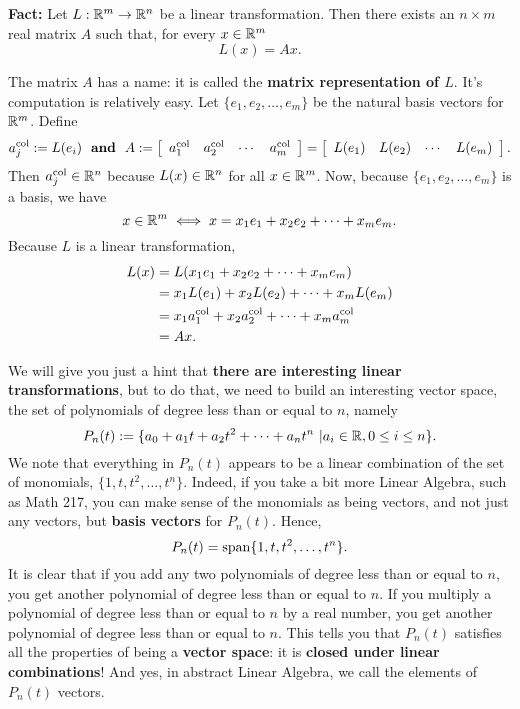 \begin{tcolorbox}[title=\textbf{Linear Transformations from $\real^m$ to $\real^n$ are Kind of Boring}]

\textbf{Fact:} Let $L:\mathbb R^m \to \mathbb R^n $ be a linear transformation. Then there exists an $n \times m$ real matrix $A$ such that, for every $x \in \mathbb R^m$
$$L(x)=Ax. $$

The matrix $A$ has a name: it is called the \textbf{matrix representation of $L$}. It's computation is relatively easy. Let $\{ e_1, e_2, \ldots, e_m \}$ be the natural basis vectors for $\real^m$. Define
$$a_j^{\rm col}:=L(e_i) ~~\textbf{and}~~A:=\left[ \begin{array}{cccc}
a_1^{\rm col} & a_2^{\rm col} & \cdots & a_m^{\rm col}
\end{array}\right] = \left[ \begin{array}{cccc}
L(e_1) & L(e_2) & \cdots & L(e_m) \end{array}\right]. $$
Then $a_j^{\rm col} \in \mathbb R^n$ because $L(x) \in \mathbb R^n$ for all $x\in \mathbb R^m$. Now, because $\{ e_1, e_2, \ldots, e_m \}$ is a basis, we have
$$x\in \mathbb R^m \iff x = x_1 e_1 + x_2 e_2 + \cdots + x_m e_m. $$
Because $L$ is a linear transformation, 
\begin{align*}
   L(x) &=  L(x_1 e_1 + x_2 e_2 + \cdots + x_m e_m) \\
   &= x_1 L(e_1) + x_2 L(e_2) + \cdots +  x_m L(e_m) \\
   &= x_1 a_1^{\rm col} + x_2 a_2^{\rm col} + \cdots +  x_m a_m^{\rm col}\\
   &= A x.
\end{align*}
\end{tcolorbox}

\vspace*{0.2cm}
 
We will give you just a hint that \textbf{there are interesting linear transformations}, but to do that, we need to build an interesting vector space, the set of polynomials of degree less than or equal to $n$, namely  $$P_n(t):=\{ a_0 + a_1 t + a_2 t^2 + \cdots + a_n t^n~| a_i \in \mathbb R, 0 \le i \le n\}. $$
 We note that everything in $P_n(t)$ appears to be a linear combination of the set of monomials, $\{1, t, t^2, \ldots, t^n \}$.
 Indeed, if you take a bit more Linear Algebra, such as Math 217, you can make sense of the monomials as being vectors, and not just any vectors, but \textbf{basis vectors} for $P_n(t)$. Hence, 
 $$P_n(t) = \mathrm{span} \{  1, t, t^2, \ldots, t^n  \}. $$
 It is clear that if you add any two polynomials of degree less than or equal to $n$, you get another polynomial of degree less than or equal to $n$. If you multiply a polynomial of degree less than or equal to $n$ by a real number, you get another polynomial of degree less than or equal to $n$. This tells you that $P_n(t)$ satisfies all the properties of being a \textbf{vector space}: it is \textbf{closed under linear combinations}! And yes, in abstract Linear Algebra, we call the elements of $P_n(t)$ vectors. \\
 
